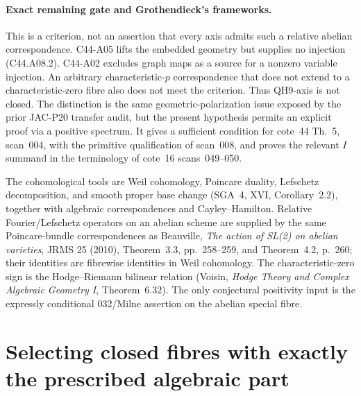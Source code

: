 \documentclass[11pt]{article}
\theoremstyle{remark}\newtheorem{remark}[theorem]{Remark}
\begin{document}
\paragraph{Exact remaining gate and Grothendieck's frameworks.}
This is a criterion, not an assertion that every axis admits
such a relative abelian correspondence. C44-A05 lifts the
embedded geometry but supplies no injection (C44.A08.2).
C44-A02 excludes graph maps as a source for a nonzero variable
injection. An arbitrary characteristic-$p$ correspondence that
does not extend to a characteristic-zero fibre also does not
meet the criterion. Thus QH9-axis is not closed. The distinction
is the same geometric-polarization issue exposed by the prior
JAC-P20 transfer audit, but the present hypothesis permits an
explicit proof via a positive spectrum. It gives a sufficient
condition for cote~44 Th.~5, scan~004, with the primitive
qualification of scan~008, and proves the relevant $I$ summand
in the terminology of cote~16 scans~049--050.

The cohomological tools are Weil cohomology, Poincare duality,
Lefschetz decomposition, and smooth proper base change (SGA~4,
XVI, Corollary~2.2), together with algebraic correspondences and
Cayley--Hamilton. Relative Fourier/Lefschetz operators on an
abelian scheme are supplied by the same Poincare-bundle
correspondences as Beauville, \emph{The action of SL(2) on abelian
varieties}, JRMS 25 (2010), Theorem~3.3, pp.~258--259, and
Theorem~4.2, p.~260;
their identities are fibrewise identities in Weil cohomology.
The characteristic-zero sign is the Hodge--Riemann bilinear
relation (Voisin, \emph{Hodge Theory and Complex Algebraic
Geometry I}, Theorem~6.32). The only conjectural positivity
input is the expressly conditional 032/Milne assertion on the
abelian special fibre.


\section{Selecting closed fibres with exactly the prescribed algebraic part}
\label{sec:c44-a12}
\end{document}
